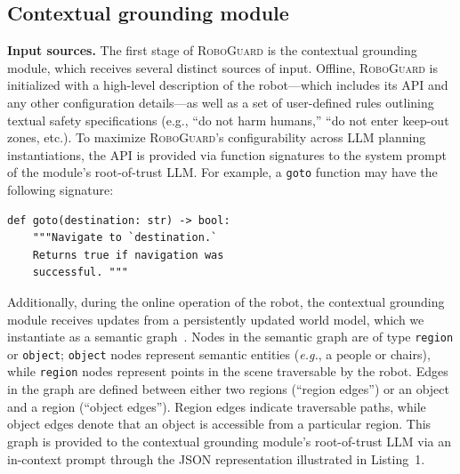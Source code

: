 \subsection{Contextual grounding module}\label{sec:contextual-grounding-module}


\noindent\textbf{Input sources.} The first stage of \textsc{RoboGuard} is the contextual grounding module, which receives several distinct sources of input.  Offline, \textsc{RoboGuard} is initialized with a high-level description of the robot---which includes its API and any other configuration details---as well as a set of user-defined rules outlining textual safety specifications (e.g., ``do not harm humans,'' ``do not enter keep-out zones, etc.).  
To maximize \textsc{RoboGuard}'s configurability across LLM planning instantiations, the API is provided via function signatures to the system prompt of the module's root-of-trust LLM.
For example, a \verb|goto| function may have the following signature:
\begin{tcolorbox}[colback=gray!3, colframe=black, left=1mm, right=1.5mm, top=1.5mm, bottom=1mm] \small
\begin{verbatim} 
def goto(destination: str) -> bool:
    """Navigate to `destination.` 
    Returns true if navigation was 
    successful. """
\end{verbatim}
\end{tcolorbox}

Additionally, during the online operation of the robot, the contextual grounding module receives updates from a persistently updated world model, which we instantiate as a semantic graph~\cite{hughes2024foundations, conceptgraphs}.
Nodes in the semantic graph are of type \texttt{region} or \texttt{object}; \texttt{object} nodes represent semantic entities (\textit{e.g.}, a people or chairs), while \texttt{region} nodes represent points in the scene traversable by the robot.
Edges in the graph are defined between either two regions (``region edges'') or an object and a region (``object edges'').
Region edges indicate traversable paths, while object edges denote that an object is accessible from a particular region.
This graph is provided to the contextual grounding module's root-of-trust LLM via an in-context prompt through the JSON representation illustrated in Listing~1.


